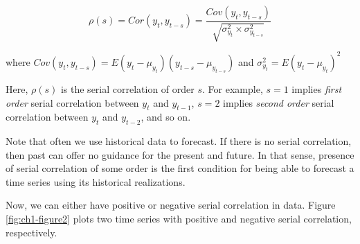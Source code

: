 \documentclass[]{book}
\theoremstyle{definition}
\theoremstyle{definition}
\theoremstyle{definition}
\theoremstyle{remark}
\begin{document}
\begin{equation}
\rho(s)=Cor(y_t, y_{t-s}) =\frac{   Cov(y_t,y_{t-s})}{\sqrt{\sigma^2_{y_t} \times \sigma^2_{y_{t-s}}}}
\label{eq:sercor}
\end{equation}

where \(Cov(y_t,y_{t-s})= E(y_t-\mu_{y_t})(y_{t-s}-\mu_{y_{t-s}})\) and \(\sigma^2_{y_t}=E(y_t-\mu_{y_t})^2\)

Here, \(\rho(s)\) is the serial correlation of order \(s\). For example, \(s=1\) implies \emph{first order} serial correlation between \(y_t\) and \(y_{t-1}\), \(s=2\) implies \emph{second order} serial correlation between \(y_t\) and \(y_{t-2}\), and so on.

Note that often we use historical data to forecast. If there is no serial correlation, then past can offer no guidance for the present and future. In that sense, presence of serial correlation of some order is the first condition for being able to forecast a time series using its historical realizations.

Now, we can either have positive or negative serial correlation in data. Figure \ref{fig:ch1-figure2} plots two time series with positive and negative serial correlation, respectively.
\end{document}

